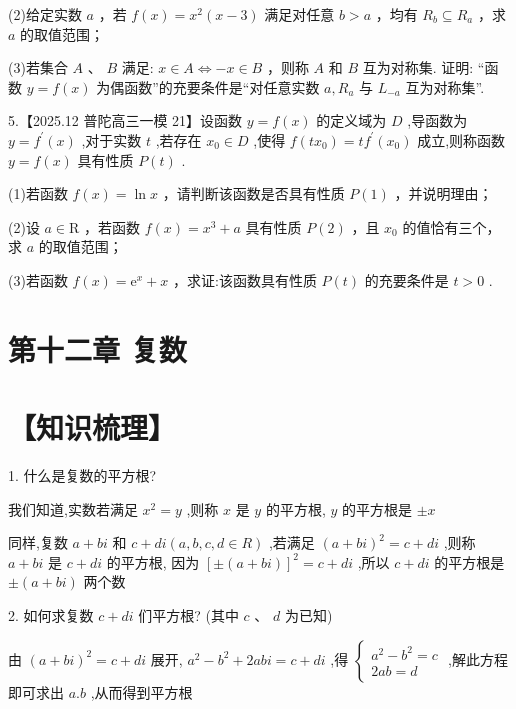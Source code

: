 \documentclass[10pt]{article}
\begin{document}
(2)给定实数 \(a\) ，若 \(f\left( x\right)  = {x}^{2}\left( {x - 3}\right)\) 满足对任意 \(b > a\) ，均有 \({R}_{b} \subseteq  {R}_{a}\) ，求 \(a\) 的取值范围；

(3)若集合 \(A\) 、 \(B\) 满足: \(x \in  A \Leftrightarrow   - x \in  B\) ，则称 \(A\) 和 \(B\) 互为对称集. 证明: “函数 \(y = f\left( x\right)\) 为偶函数”的充要条件是“对任意实数 \(a,{R}_{a}\) 与 \({L}_{-a}\) 互为对称集”.

5.【2025.12 普陀高三一模 21】设函数 \(y = f\left( x\right)\) 的定义域为 \(D\) ,导函数为 \(y = {f}^{\prime }\left( x\right)\) ,对于实数 \(t\) ,若存在 \({x}_{0} \in  D\) ,使得 \(f\left( {t{x}_{0}}\right)  = t{f}^{\prime }\left( {x}_{0}\right)\) 成立,则称函数 \(y = f\left( x\right)\) 具有性质 \(P\left( t\right)\) .

(1)若函数 \(f\left( x\right)  = \ln x\) ，请判断该函数是否具有性质 \(P\left( 1\right)\) ，并说明理由；

(2)设 \(a \in  \mathrm{R}\) ，若函数 \(f\left( x\right)  = {x}^{3} + a\) 具有性质 \(P\left( 2\right)\) ，且 \({x}_{0}\) 的值恰有三个，求 \(a\) 的取值范围；

(3)若函数 \(f\left( x\right)  = {\mathrm{e}}^{x} + x\) ，求证:该函数具有性质 \(P\left( t\right)\) 的充要条件是 \(t > 0\) .

\section*{第十二章 复数}

\section*{【知识梳理】}

1. 什么是复数的平方根?

我们知道,实数若满足 \({x}^{2} = y\) ,则称 \(x\) 是 \(y\) 的平方根, \(y\) 的平方根是 \(\pm  x\)

同样,复数 \(a + {bi}\) 和 \(c + {di}\left( {a,b,c,d \in  R}\right)\) ,若满足 \({\left( a + bi\right) }^{2} = c + {di}\) ,则称 \(a + {bi}\) 是 \(c + {di}\) 的平方根, 因为 \({\left\lbrack  \pm \left( a + bi\right) \right\rbrack  }^{2} = c + {di}\) ,所以 \(c + {di}\) 的平方根是 \(\pm  \left( {a + {bi}}\right)\) 两个数

2. 如何求复数 \(c + {di}\) 们平方根? (其中 \(c\text{ 、 }d\) 为已知)

由 \({\left( a + bi\right) }^{2} = c + {di}\) 展开, \({a}^{2} - {b}^{2} + {2abi} = c + {di}\) ,得 \(\left\{  \begin{matrix} {a}^{2} - {b}^{2} = c \\  {2ab} = d \end{matrix}\right.\) ,解此方程即可求出 \(a.b\) ,从而得到平方根
\end{document}
